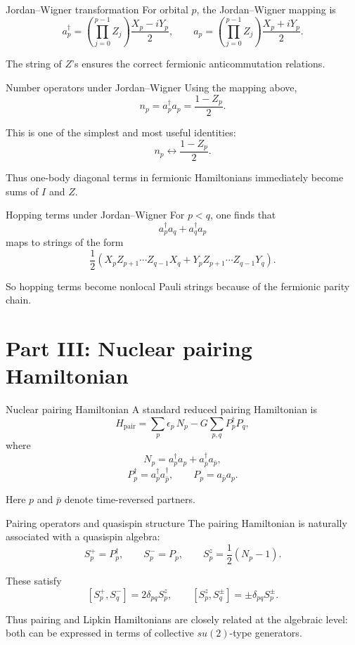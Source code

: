 \documentclass[aspectratio=169]{beamer}
\begin{document}
\begin{frame}{Jordan--Wigner transformation}
For orbital \(p\), the Jordan--Wigner mapping is
\[
a_p^\dagger
=
\left(\prod_{j=0}^{p-1} Z_j\right)\frac{X_p-iY_p}{2},
\qquad
a_p
=
\left(\prod_{j=0}^{p-1} Z_j\right)\frac{X_p+iY_p}{2}.
\]

The string of \(Z\)'s ensures the correct fermionic anticommutation relations.
\end{frame}

\begin{frame}{Number operators under Jordan--Wigner}
Using the mapping above,
\[
n_p = a_p^\dagger a_p = \frac{1-Z_p}{2}.
\]

This is one of the simplest and most useful identities:
\[
n_p \leftrightarrow \frac{1-Z_p}{2}.
\]

Thus one-body diagonal terms in fermionic Hamiltonians immediately become sums of \(I\) and \(Z\).
\end{frame}

\begin{frame}{Hopping terms under Jordan--Wigner}
For \(p<q\), one finds that
\[
a_p^\dagger a_q + a_q^\dagger a_p
\]
maps to strings of the form
\[
\frac12
\left(
X_p Z_{p+1}\cdots Z_{q-1} X_q
+
Y_p Z_{p+1}\cdots Z_{q-1} Y_q
\right).
\]

So hopping terms become nonlocal Pauli strings because of the fermionic parity chain.
\end{frame}

\section{Part III: Nuclear pairing Hamiltonian}

\begin{frame}{Nuclear pairing Hamiltonian}
A standard reduced pairing Hamiltonian is
\[
H_{\mathrm{pair}}
=
\sum_{p} \epsilon_p \, N_p
-
G \sum_{p,q} P_p^\dagger P_q,
\]
where
\[
N_p = a_p^\dagger a_p + a_{\bar p}^\dagger a_{\bar p},
\]
\[
P_p^\dagger = a_p^\dagger a_{\bar p}^\dagger,
\qquad
P_p = a_{\bar p} a_p.
\]

Here \(p\) and \(\bar p\) denote time-reversed partners.
\end{frame}

\begin{frame}{Pairing operators and quasispin structure}
The pairing Hamiltonian is naturally associated with a quasispin algebra:
\[
S_p^+ = P_p^\dagger,
\qquad
S_p^- = P_p,
\qquad
S_p^z = \frac12(N_p-1).
\]

These satisfy
\[
[S_p^+,S_q^-]=2\delta_{pq} S_p^z,
\qquad
[S_p^z,S_q^\pm]=\pm \delta_{pq}S_p^\pm.
\]

Thus pairing and Lipkin Hamiltonians are closely related at the algebraic level:
both can be expressed in terms of collective \(su(2)\)-type generators.
\end{frame}
\end{document}

